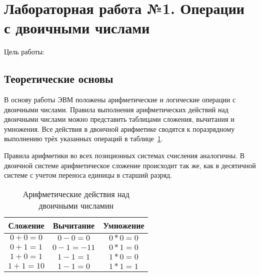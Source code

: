 


%

\section{Лабораторная работа №1. Операции с двоичными числами}

Цель работы:

\subsection{Теоретические основы}

В основу работы ЭВМ положены арифметические и логические операции с двоичными числами. Правила выполнения арифметических действий над двоичными числами можно представить таблицами сложения, вычитания и умножения. Все действия в двоичной арифметике сводятся к поразрядному выполнению трёх указанных операций в таблице~\ref{tab:mytab}.

Правила арифметики во всех позиционных системах счисления аналогичны. В двоичной системе арифметическое сложение происходит так же, как в десятичной системе с учетом переноса единицы в старший разряд.

\begin{table}[h]
  \caption{Арифметические действия над двоичными числамин}
  \begin{center}\label{tab:mytab}
    \begin{tabular}{|c|c|c|}
      \hline
     Сложение & Вычитание & Умножение \\
     \hline
     $0 + 0 = 0$ & $0 - 0 = 0$ & $0 * 0 = 0$\\
     $0 + 1 = 1$ & $0 - 1 = -11$ & $0 * 1 = 0$\\
     $1 + 0 = 1$ & $1 - 1 = 1$ & $1 * 0 = 0$\\
      $1 + 1 = 10$ & $1 - 1 = 0$ & $1 * 1 = 1$\\
      \hline
     \end{tabular}
  \end{center}       
\end{table}

